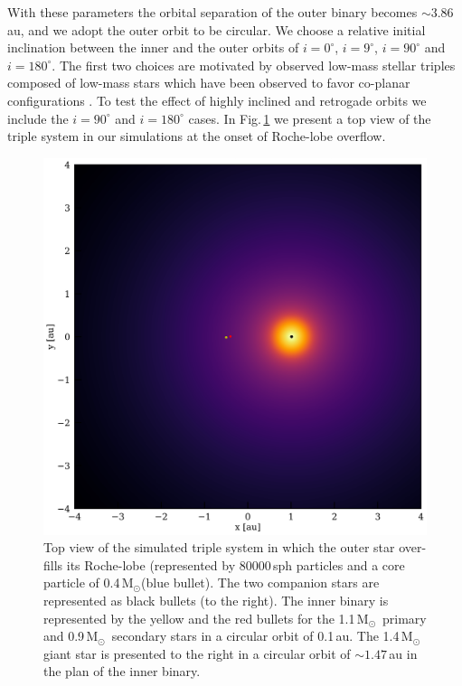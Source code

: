 \documentclass{aastex62}
\newcommand{\MSun}{\mbox{M$_\odot$}}
\begin{document}
With these parameters the orbital separation of the outer binary
becomes $\sim 3.86$\,au, and we adopt the outer orbit to be circular.
We choose a relative initial inclination between the inner and the
outer orbits of $i = 0^\circ$, $i = 9^\circ$, $i = 90^\circ$ and $i =
180^\circ$.  The first two choices are motivated by observed low-mass stellar
triples composed of low-mass stars which have been observed to favor
co-planar configurations \citep{2018ApJ...854...44M}. To test the effect of highly
inclined and retrogade orbits we include the $i = 90^\circ$ and $i =
180^\circ$ cases.  In Fig.\,\ref{fig:topview_at_t0} we present a top
view of the triple system in our simulations at the onset of Roche-lobe overflow.

\begin{figure}[ht!]
  \includegraphics[width=\columnwidth]{fig_BBSS_gas_M14Msun_A010au_t0002.pdf}
\caption{Top view of the simulated triple system in which the outer
  star over-fills its Roche-lobe (represented by 80000\,sph particles
  and a core particle of 0.4\,\MSun (blue bullet). The two companion
  stars are represented as black bullets (to the right).  The inner
  binary is represented by the yellow and the red bullets for the
  1.1\,\MSun\, primary and 0.9\,\MSun\, secondary stars in a circular
  orbit of 0.1\,au. The 1.4\,\MSun\, giant star is presented to the
  right in a circular orbit of $\sim 1.47$\,au in the plan of the
  inner binary.
\label{fig:topview_at_t0}}
\end{figure}
\end{document}
